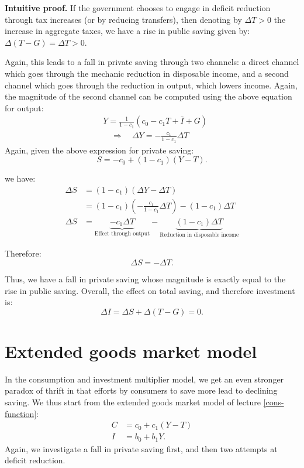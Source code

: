 \documentclass[]{book}
\begin{document}
\textbf{Intuitive proof.} If the government chooses to engage in deficit
reduction through tax increases (or by reducing transfers), then
denoting by \(\Delta T>0\) the increase in aggregate taxes, we have a
rise in public saving given by: \(\Delta(T-G)=\Delta T>0\).

Again, this leads to a fall in private saving through two channels: a
direct channel which goes through the mechanic reduction in disposable
income, and a second channel which goes through the reduction in output,
which lowers income. Again, the magnitude of the second channel can be
computed using the above equation for output: \[
\begin{aligned}
&Y=\frac{1}{1-c_{1}}\left(c_{0}-c_{1}T+\bar{I}+G\right)\\
&\quad\Rightarrow\quad\Delta Y=-\frac{c_{1}}{1-c_{1}}\Delta T
\end{aligned}
\] Again, given the above expression for private saving:
\[S=-c_{0}+\left(1-c_{1}\right)\left(Y-T\right).\]

we have: \[
\begin{aligned}
\Delta S    &=(1-c_{1})(\Delta Y-\Delta T)\\
    &=(1-c_{1})\left(-\frac{c_{1}}{1-c_{1}}\Delta T\right)-(1-c_{1})\Delta T\\
\Delta S    &=\underbrace{-c_{1}\Delta T}_{\text{Effect through output}}-\underbrace{(1-c_{1})\Delta T}_{\text{Reduction in disposable income}}
\end{aligned}
\]

Therefore: \[\Delta S=-\Delta T.\]

Thus, we have a fall in private saving whose magnitude is exactly equal
to the rise in public saving. Overall, the effect on total saving, and
therefore investment is: \[\Delta I  =\Delta S+\Delta(T-G)=0.\]

\section{Extended goods market model}\label{extended}

In the consumption and investment multiplier model, we get an even
stronger paradox of thrift in that efforts by consumers to save more
lead to declining saving. We thus start from the extended goods market
model of lecture \ref{cons-function}: \[
\begin{aligned}
C   &=c_{0}+c_{1}\left(Y-T\right)\\
I   &=b_{0}+b_{1}Y.
\end{aligned}
\] Again, we investigate a fall in private saving first, and then two
attempts at deficit reduction.
\end{document}
